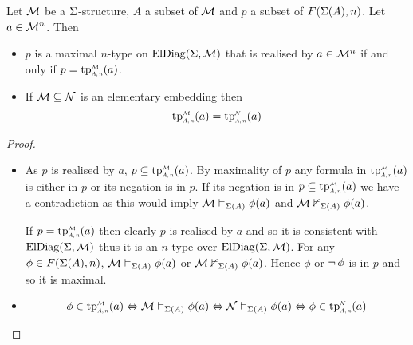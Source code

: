 \begin{prop}
    Let $\mathcal{M}$ be a $\Sigma$-structure,
    $A$ a subset of ${\mathcal{M}}$ and $p$ a subset of $F(\Sigma(A),n)$.
    Let $a \in {\mathcal{M}}^n$.
    Then \begin{itemize}
        \item $p$ is a maximal $n$-type on $\mathrm{ElDiag}(\Sigma,\mathcal{M})$ 
            that is realised by $a \in {\mathcal{M}}^n$ 
            if and only if $p = \subintp{A,n}{\MM}{\tp}(a)$.
        \item If $\mathcal{M} \subseteq \mathcal{N}$ is an elementary embedding then
            \[\subintp{A,n}{\MM}{\tp}(a) = \subintp{A,n}{\NN}{\tp}(a)\]
    \end{itemize}
\end{prop}
\begin{proof}~\begin{itemize}
    \item \begin{forward}
        As $p$ is realised by $a$, 
        $p \subs \subintp{A,n}{\MM}{\tp}(a)$.
        By maximality of $p$ any formula in $\subintp{A,n}{\MM}{\tp}(a)$ 
        is either in $p$
        or its negation is in $p$.
        If its negation is in $p \subs \subintp{A,n}{\MM}{\tp}(a)$ we have a
        contradiction as this would imply $\mathcal{M} \vDash_{\Sigma(A)} \phi(a)$ and
        $\mathcal{M} \nvDash_{\Sigma(A)} \phi(a)$.
    \end{forward}
    \begin{backward}
        If $p = \subintp{A,n}{\MM}{\tp}(a)$ 
        then clearly $p$ is realised by $a$ and so it is consistent with 
        $\mathrm{ElDiag}(\Sigma,\mathcal{M})$ thus it is an $n$-type over $\mathrm{ElDiag}(\Sigma,\mathcal{M})$.
        For any $\phi \in F(\Sigma(A),n)$,
        $\mathcal{M} \vDash_{\Sigma(A)} \phi(a)$ or $\mathcal{M} \nvDash_{\Sigma(A)} \phi(a)$.
        Hence $\phi$ or $\neg\, \phi$ is in $p$ and so it is maximal.
    \end{backward}
    \item \[\phi \in \subintp{A,n}{\MM}{\tp}(a) \iff \MM \model{\Si(A)} \phi(a)
        \iff \NN \model{\Si(A)} \phi(a) \iff 
        \phi \in \subintp{A,n}{\NN}{\tp}(a)\]
\end{itemize}\end{proof}

